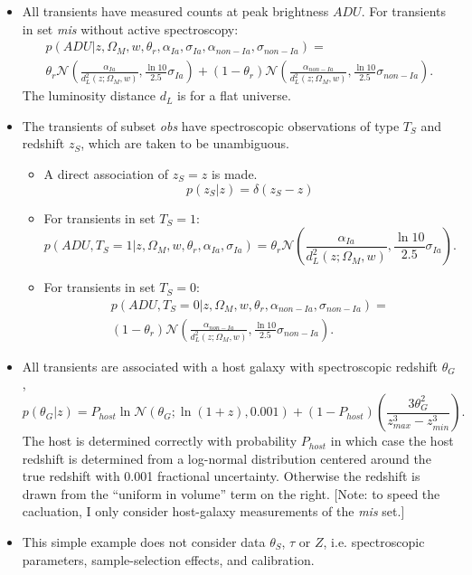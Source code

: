 \documentclass[preprint]{aastex}
\begin{document}
\begin{itemize}
\item All transients have measured counts at peak brightness $\mathit{ADU}$.
For transients in set {\it mis} without active spectroscopy:
\begin{multline}
p(\mathit{ADU}| z, \Omega_M, w, \theta_r, \alpha_{Ia},\sigma_{Ia}, \alpha_{\mathit{non-Ia}},\sigma_{\mathit{non-Ia}})=\\
\theta_r\mathcal{N}\left(\frac{\alpha_{Ia}}{d_L^2(z;\Omega_M, w)}, \frac{\ln{10}}{2.5}\sigma_{Ia}\right)+\left(1-\theta_r\right)
\mathcal{N}\left(\frac{\alpha_{\mathit{non-Ia}}}{d_L^2(z;\Omega_M, w)}, \frac{\ln{10}}{2.5}\sigma_{\mathit{non-Ia}}\right).
\end{multline}
The luminosity distance $d_L$ is for a flat universe.  
\item The transients of subset {\it obs} have spectroscopic observations of type $T_S$ and redshift
$z_S$, which are taken to be unambiguous.
\begin{itemize}
\item A direct association of $z_S=z$ is made.
\begin{equation}
p(z_S|z) = \delta(z_S-z)
\label{specz:eqn}
\end{equation}
\item For transients in set $T_S=1$:
\begin{equation}
p(\mathit{ADU}, T_S=1 | z, \Omega_M, w, \theta_r, \alpha_{Ia},\sigma_{Ia})=
\theta_r\mathcal{N}\left(\frac{\alpha_{Ia}}{d_L^2(z;\Omega_M, w)}, \frac{\ln{10}}{2.5}\sigma_{Ia}\right).
\end{equation}
\item For transients in set $T_S=0$:
\begin{multline}
p(\mathit{ADU}, T_S=0 | z, \Omega_M, w, \theta_r, \alpha_{\mathit{non-Ia}},\sigma_{\mathit{non-Ia}})= \\
\left(1-\theta_r\right)
\mathcal{N}\left(\frac{\alpha_{\mathit{non-Ia}}}{d_L^2(z;\Omega_M, w)}, \frac{\ln{10}}{2.5}\sigma_{\mathit{non-Ia}}\right).
\end{multline}
\end{itemize}
\item All transients are associated with a host galaxy with spectroscopic redshift $\theta_G$,
\begin{equation}
p(\theta_G|z) =
	P_{host} \ln{\mathcal{N}}(\theta_G;\ln(1+z),0.001) + (1-P_{host})\left(\frac{3 \theta_G^2}{z_{max}^3 - z_{min}^3}\right).
\end{equation}
The host is determined correctly with probability $P_{host}$ in which case the
host redshift is determined from a log-normal distribution centered around the true redshift
with 0.001 fractional uncertainty.   Otherwise the redshift is drawn from the ``uniform in volume'' term on the right.
[Note: to speed the cacluation, I only consider host-galaxy measurements
of the {\it mis} set.]
\item This simple example does not consider data $\theta_S$, $\tau$ or $Z$, i.e.
spectroscopic parameters, sample-selection effects, and calibration.
\end{itemize}
\end{document}
